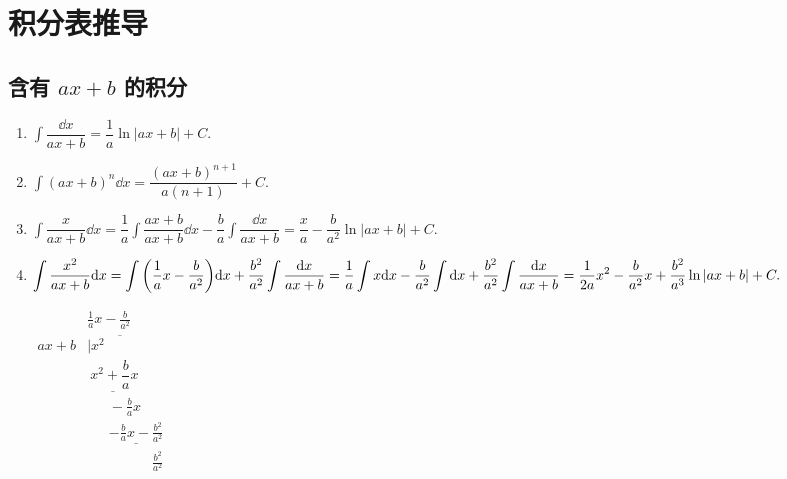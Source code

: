\appendix
\renewcommand{\appendixname}{附录}
\footnotesize\linespread{0.6}
\chapter{积分表推导}

\section{含有 \texorpdfstring{$ax+b$}. 的积分}

\begin{enumerate}[label=\roman{*}.]
    \item $\displaystyle\int\dfrac{\dd x}{ax+b}=\dfrac{1}{a}\ln|ax+b|+C.$
    \item $\displaystyle\int(ax+b)^n\dd x=\dfrac{(ax+b)^{n+1}}{a(n+1)}+C.$
    \item $\displaystyle\int\dfrac{x}{ax+b}\dd x=\dfrac{1}{a}\int\dfrac{ax+b}{ax+b}\dd x-\dfrac{b}{a}\int\dfrac{\dd x}{ax+b}=\dfrac{x}{a}-\dfrac{b}{a^2}\ln|ax+b|+C.$
    \item \begin{minipage}{0.68\linewidth}
              $\displaystyle\int\dfrac{x^2}{ax+b}\dd x=\int\qty(\dfrac{1}{a}x-\dfrac{b}{a^2})\dd x+\dfrac{b^2}{a^2}\int\dfrac{\dd x}{ax+b}\\
                  =\dfrac{1}{a}\int x\dd x-\dfrac{b}{a^2}\int\dd x+\dfrac{b^2}{a^2}\int\dfrac{\dd x}{ax+b}
                  =\dfrac{1}{2a}x^2-\dfrac{b}{a^2}x+\dfrac{b^2}{a^3}\ln|ax+b|+C.$
          \end{minipage}\hfill
          \begin{minipage}{0.28\linewidth}
              $\begin{array}{ll}
                           & \frac{1}{a}x-\frac{b}{a^2}                       \\
                      ax+b & \overline{|x^2\quad\quad\quad~~}                 \\
                           & \underline{~x^2+\dfrac{b}{a}x}                   \\
                           & ~~~~~~~-\frac{b}{a} x                            \\
                           & ~~~~~~~\underline{-\frac{b}{a}x-\frac{b^2}{a^2}} \\
                           & ~~~~~~~~~~~~~~~~~~~~~\frac{b^2}{a^2}
                  \end{array}$
          \end{minipage}

\end{enumerate}
